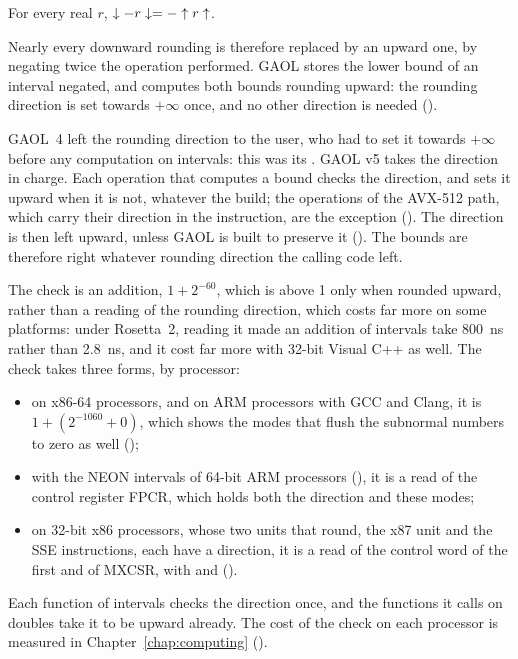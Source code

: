 \documentclass[12pt,a4paper,twoside,openright]{book}
\begin{document}
\begin{Prop}\label{prop:rounding-negation}
For every real $r$, $\downarrow-r\downarrow=-\uparrow r\uparrow$.
\end{Prop}

\noindent
Nearly every downward rounding is therefore replaced by an upward one, by
negating twice the operation performed. GAOL stores the lower bound of an
interval negated, and computes both bounds rounding upward: the rounding
direction is set towards $+\infty$ once, and no other direction is needed
().

\medskip
GAOL~4 left the rounding direction to the user, who had to set it towards
$+\infty$ before any computation on intervals: this was its . GAOL v5 takes the direction in charge.\newinvfive{} Each
operation that computes a bound checks the direction, and sets it upward when
it is not, whatever the build; the operations of the AVX-512 path, which carry
their direction in the instruction, are the exception ().
The direction is then left upward, unless GAOL is built to preserve it
(). The bounds are therefore right whatever
rounding direction the calling code left.
%

\medskip
The check is an addition, $1+2^{-60}$, which is above 1 only when rounded
upward, rather than a reading of the rounding direction, which costs far more
on some platforms: under Rosetta~2, reading it made an addition of intervals
take 800~ns rather than 2.8~ns, and it cost far more with 32-bit Visual C++
as well. The check takes three forms, by processor:
\begin{itemize}
\item on x86-64 processors, and on ARM processors with GCC and Clang, it is
  $1+(2^{-1060}+0)$, which shows the modes that flush the subnormal numbers to
  zero as well ();
\item with the NEON intervals of 64-bit ARM processors (), it
  is a read of the control register FPCR, which holds both the direction and
  these modes;
\item on 32-bit x86 processors, whose two units that round, the x87 unit and
  the SSE instructions, each have a direction, it is a read of the control
  word of the first and of MXCSR, with  and 
  ().\newinvfive
\end{itemize}
\noindent
Each function of intervals checks the direction once, and the functions it
calls on doubles take it to be upward already. The cost of the check on each
processor is measured in Chapter~\ref{chap:computing}
().
\end{document}
